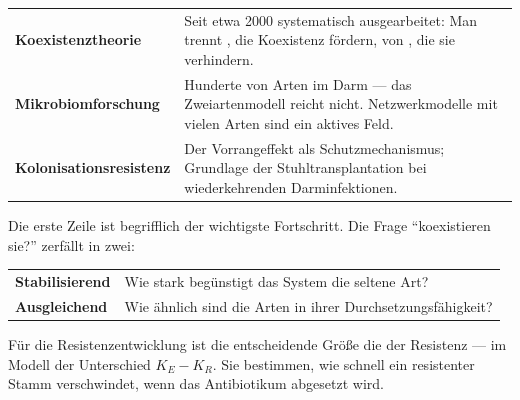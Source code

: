 \begin{forschung}
\begin{center}
{\small
\renewcommand{\arraystretch}{1.45}
\begin{tabular}{@{}P{2.8cm}P{5.4cm}@{}}
\toprule
\textbf{Koexistenz\-theorie} & Seit etwa 2000 systematisch ausgearbeitet: Man trennt , die Koexistenz fördern, von , die sie verhindern.\\
\textbf{Mikrobiom\-forschung} & Hunderte von Arten im Darm --- das Zweiartenmodell reicht nicht. Netzwerkmodelle mit vielen Arten sind ein aktives Feld.\\
\textbf{Kolonisations\-resistenz} & Der Vorrangeffekt als Schutzmechanismus; Grundlage der Stuhltransplantation bei wiederkehrenden Darminfektionen.\\
\bottomrule
\end{tabular}}
\end{center}

Die erste Zeile ist begrifflich der wichtigste Fortschritt. Die Frage \enquote{koexistieren sie?} zerfällt in zwei:

\begin{center}
\renewcommand{\arraystretch}{1.5}
\begin{tabular}{@{}P{2.8cm}P{5.8cm}@{}}
\toprule
\textbf{Stabilisierend} & Wie stark begünstigt das System die seltene Art?\\
\textbf{Ausgleichend} & Wie ähnlich sind die Arten in ihrer Durchsetzungsfähigkeit?\\
\bottomrule
\end{tabular}
\end{center}

\begin{center}
\begin{minipage}{0.88\textwidth}
\end{minipage}
\end{center}

Für die Resistenzentwicklung ist die entscheidende Größe die  der Resistenz --- im Modell der Unterschied $K_E - K_R$. Sie bestimmen, wie schnell ein resistenter Stamm verschwindet, wenn das Antibiotikum abgesetzt wird.

\begin{center}
\begin{minipage}{0.88\textwidth}
\end{minipage}
\end{center}
\end{forschung}


